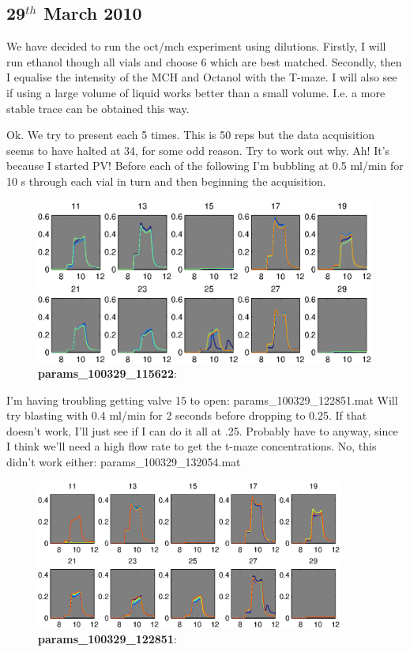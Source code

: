 \documentclass[a4paper]{report}
\begin{document}
\clearpage
\subsection{29$^{th}$ March 2010}
We have decided to run the oct/mch experiment using
dilutions. Firstly, I will run ethanol though all vials and choose 6
which are best matched. Secondly, then I equalise the intensity of the
MCH and Octanol with the T-maze. I will also see if using a large
volume of liquid works better than a small volume. I.e. a more stable
trace can be obtained this way. 

Ok. We try to present each 5 times. This is 50 reps but the data
acquisition seems to have halted at 34, for some odd reason. Try to
work out why. Ah! It's because I started PV!  Before each of the
following I'm bubbling at 0.5 ml/min for 10 s through each vial in
turn and then beginning the acquisition. 


\begin{figure}[h]
\centering
\includegraphics[width=5in]{params_100329_115622.eps}
\caption{\textbf{params\_100329\_115622}:}
\end{figure}


I'm having troubling getting valve 15 to open: params\_100329\_122851.mat
Will try blasting with 0.4 ml/min for 2 seconds before dropping to
0.25. If that doesn't work, I'll just see if I can do it all at
.25. Probably have to anyway, since I think we'll need a high flow
rate to get the t-maze concentrations. 
No, this didn't work either: params\_100329\_132054.mat


\begin{figure}[h]
\centering
\includegraphics[width=4in]{params_100329_122851.eps}
\caption{\textbf{params\_100329\_122851}:}
\end{figure}
\end{document}
